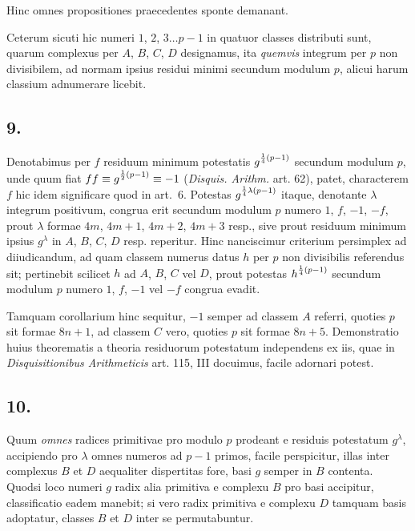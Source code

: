 \documentclass[twoside,12pt, showframe]{memoir}
\let\oldfrac\frac
\def\frac#1#2{\mathchoice{\tfrac{#1}{#2}}{\oldfrac{#1}{#2}}{\genfrac{}{}{}{2}{#1}{#2\mathstrut}}{\genfrac{}{}{}{3}{#1}{#2\mathstrut}}}
\begin{document}
Hinc omnes propositiones praecedentes sponte demanant.
 
Ceterum sicuti hic numeri \(1\), \(2\), \(3 \ldots p-1\) in quatuor classes distributi sunt, quarum complexus per \(A\), \(B\), \(C\), \(D\) designamus, ita \textit{quemvis} integrum per \(p\) non divisibilem, ad normam ipsius residui minimi secundum modulum \(p\), alicui harum classium adnumerare licebit.

\subsection*{9.}
 
Denotabimus per \(f\) residuum minimum potestatis \(g^{\frac{1}{4}(p-1)}\) secundum modulum \(p\), unde quum fiat \(f f \equiv g^{\frac{1}{2}(p-1)} \equiv-1\) (\textit{Disquis. Arithm.} art. 62), patet, characterem \(f\) hic idem significare quod in art.\ 6. Potestas \(g^{\frac{1}{4} \lambda(p-1)}\) itaque, denotante \(\lambda\) integrum positivum, congrua erit secundum modulum \(p\) numero \(1\), \(f\), \(-1\), \(-f\), prout \(\lambda\) formae \(4 m\), \(4 m+1\), \(4 m+2\), \(4 m+3\) resp., sive prout residuum minimum ipsius \(g^{\lambda}\) in \(A\), \(B\), \(C\), \(D\) resp. reperitur. Hinc nanciscimur criterium persimplex ad diiudicandum, ad quam classem numerus datus \(h\) per \(p\) non divisibilis referendus sit; pertinebit scilicet \(h\) ad \(A\), \(B\), \(C\) vel \(D\), prout potestas \(h^{\frac{1}{4}(p-1)}\) secundum modulum \(p\) numero \(1\), \(f\), \(-1\) vel \(-f\) congrua evadit.
 
Tamquam corollarium hinc sequitur, \(-1\) semper ad classem \(A\) referri, quoties \(p\) sit formae \(8 n+1\), ad classem \(C\) vero, quoties \(p\) sit formae \(8 n+5\). Demonstratio huius theorematis a theoria residuorum potestatum independens ex iis, quae in \textit{Disquisitionibus Arithmeticis} art. 115, III docuimus, facile adornari potest.

\subsection*{10.}
 
Quum \textit{omnes} radices primitivae pro modulo \(p\) prodeant e residuis potestatum \(g^{\lambda}\), accipiendo pro \(\lambda\) omnes numeros ad \(p-1\) primos, facile perspicitur, illas inter complexus \({B}\) et \({D}\) aequaliter dispertitas fore, basi \({g}\) semper in \({B}\) contenta. Quodsi loco numeri \(g\) radix alia primitiva e complexu \(B\) pro basi accipitur, classificatio eadem manebit; si vero radix primitiva e complexu \(D\) tamquam basis adoptatur, classes \(B\) et \(D\) inter se permutabuntur.
 
\end{document}
